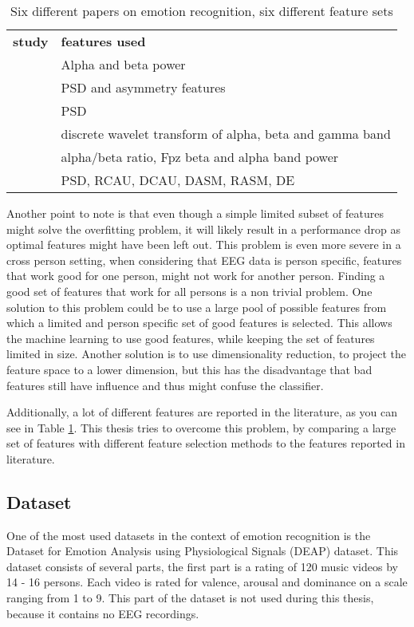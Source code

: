 \begin{table}[]
\centering
\caption{Six different papers on emotion recognition, six different feature sets}
\label{diffFeat}
\begin{tabular}{ll}
\textbf{study} & \textbf{features used}                         \\
\citep{ref4}     & Alpha and beta power                           \\
\citep{ref7}     & PSD and asymmetry features                     \\
\citep{ref8}     & PSD                                            \\
\citep{ref6}     & discrete wavelet transform of alpha, beta and gamma band \\
\citep{ExtendedPaper}	&	alpha/beta ratio, Fpz beta and alpha band power \\
\citep{killyPaper} & PSD, RCAU, DCAU, DASM, RASM, DE \\
\end{tabular}
\end{table}

Another point to note is that even though a simple limited subset of features might solve the overfitting problem, it will likely result in a performance drop as optimal features might have been left out. This problem is even more severe in a cross person setting, when considering that EEG data is person specific\citep{DEAP}, features that work good for one person, might not work for another person. Finding a good set of features that work for all persons is a non trivial problem. One solution to this problem could be to use a large pool of possible features from which a limited and person specific set of good features is selected. This allows the machine learning to use good features, while keeping the set of features limited in size. Another solution is to use dimensionality reduction, to project the feature space to a lower dimension, but this has the disadvantage that bad features still have influence and thus might confuse the classifier. 

\npar

Additionally, a lot of different features are reported in the literature, as you can see in Table \ref{diffFeat}. This thesis tries to overcome this problem, by comparing a large set of features with different feature selection methods to the features reported in literature.

\subsection{Dataset}
One of the most used datasets in the context of emotion recognition is the Dataset for Emotion Analysis using Physiological Signals (DEAP) dataset\cite{DEAP}. This dataset consists of several parts, the first part is a rating of 120 music videos by 14 - 16 persons. Each video is rated for valence, arousal and dominance on a scale ranging from 1 to 9. This part of the dataset is not used during this thesis, because it contains no EEG recordings.

